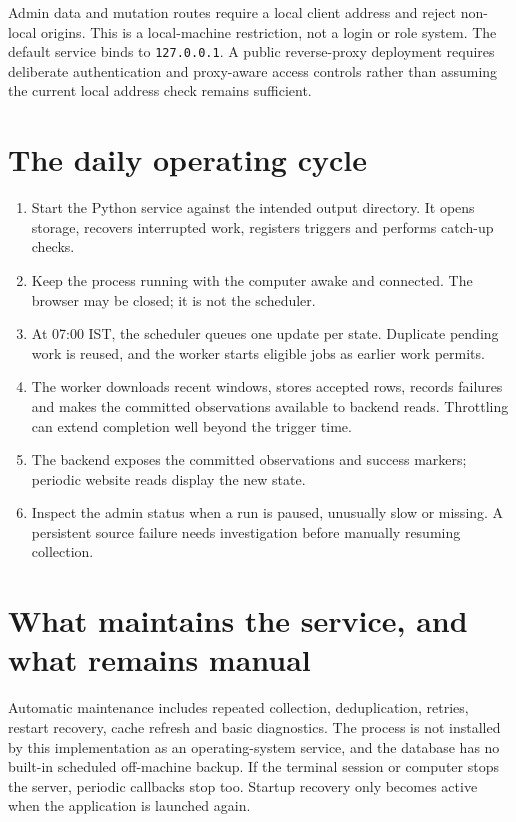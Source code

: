 \documentclass[12pt,a4paper,oneside]{report}
\numberwithin{equation}{chapter}
\numberwithin{figure}{chapter}
\numberwithin{table}{chapter}
\theoremstyle{definition}
\begin{document}
Admin data and mutation routes require a local client address and reject non-local origins. This is a local-machine restriction, not a login or role system. The default service binds to \texttt{127.0.0.1}. A public reverse-proxy deployment requires deliberate authentication and proxy-aware access controls rather than assuming the current local address check remains sufficient.

\section{The daily operating cycle}
\begin{enumerate}
  \item Start the Python service against the intended output directory. It opens storage, recovers interrupted work, registers triggers and performs catch-up checks.
  \item Keep the process running with the computer awake and connected. The browser may be closed; it is not the scheduler.
  \item At 07:00 IST, the scheduler queues one update per state. Duplicate pending work is reused, and the worker starts eligible jobs as earlier work permits.
  \item The worker downloads recent windows, stores accepted rows, records failures and makes the committed observations available to backend reads. Throttling can extend completion well beyond the trigger time.
  \item The backend exposes the committed observations and success markers; periodic website reads display the new state.
  \item Inspect the admin status when a run is paused, unusually slow or missing. A persistent source failure needs investigation before manually resuming collection.
\end{enumerate}

\section{What maintains the service, and what remains manual}
Automatic maintenance includes repeated collection, deduplication, retries, restart recovery, cache refresh and basic diagnostics. The process is not installed by this implementation as an operating-system service, and the database has no built-in scheduled off-machine backup. If the terminal session or computer stops the server, periodic callbacks stop too. Startup recovery only becomes active when the application is launched again.
\end{document}

